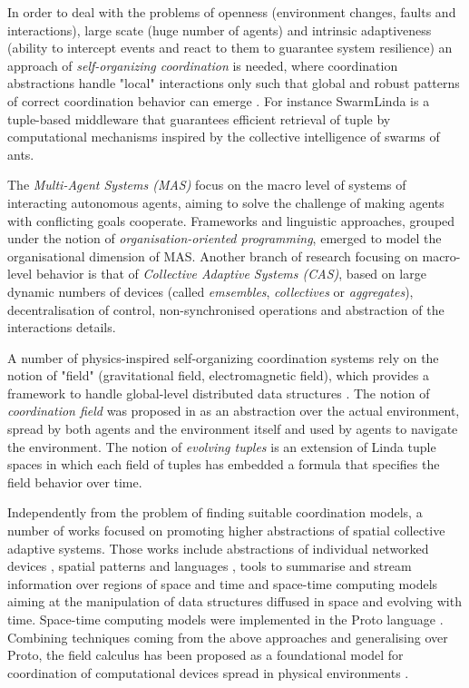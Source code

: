 In order to deal with the problems of openness (environment changes, faults and interactions), large scate (huge number of agents) and intrinsic adaptiveness (ability to intercept events and react to them to guarantee system resilience) an approach of \textit{self-organizing coordination} is needed, where coordination abstractions handle "local" interactions only such that global and robust patterns of correct coordination behavior can emerge \cite{Survey}. For instance SwarmLinda \cite{SwarmLinda} is a tuple-based middleware that guarantees efficient retrieval of tuple by computational mechanisms inspired by the collective intelligence of swarms of ants.

The \textit{Multi-Agent Systems (MAS)} focus on the macro level of systems of interacting autonomous agents, aiming to solve the challenge of making agents with conflicting goals cooperate. Frameworks and linguistic approaches, grouped under the notion of \textit{organisation-oriented programming}, emerged to model the organisational dimension of MAS. Another branch of research focusing on macro-level behavior is that of \textit{Collective Adaptive Systems (CAS)}, based on large dynamic numbers of devices (called \textit{emsembles}, \textit{collectives} or \textit{aggregates}), decentralisation of control, non-synchronised operations and abstraction of the interactions details.

A number of physics-inspired self-organizing coordination systems rely on the notion of "field" (gravitational field, electromagnetic field), which provides a framework to handle global-level distributed data structures \cite{Survey}. The notion of \textit{coordination field} was proposed in \cite{CoField} as an abstraction over the actual environment, spread by both agents and the environment itself and used by agents to navigate the environment. The notion of \textit{evolving tuples} \cite{EvolvingTuples} is an extension of Linda tuple spaces in which each field of tuples has embedded a formula that specifies the field behavior over time.

Independently from the problem of finding suitable coordination models, a number of works focused on promoting higher abstractions of spatial collective adaptive systems. Those works include abstractions of individual networked devices \cite{Hood}, spatial patterns and languages \cite{GrowingPoint}, tools to summarise and stream information over regions of space \cite{TinyDB} and time and space-time computing models aiming at the manipulation of data structures diffused in space and evolving with time. Space-time computing models were implemented in the Proto language \cite{Proto}. Combining techniques coming from the above approaches and generalising over Proto, the field calculus has been proposed as a foundational model for coordination of computational devices spread in physical environments \cite{Survey}.
